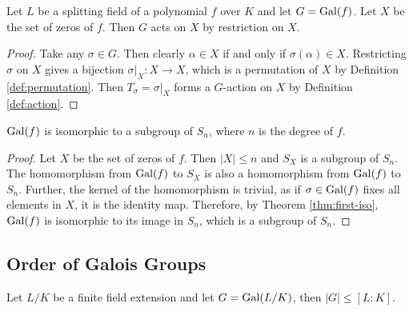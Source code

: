 \begin{theorem} \label{thm:galois-group-acts-on-zeros}
	Let $L$ be a splitting field of a polynomial $f$ over $K$ and let $G = \operatorname{Gal}(f)$. Let $X$ be the set of zeros of $f$. Then $G$ acts on $X$ by restriction on $X$. 
\end{theorem}

\begin{proof}
	Take any $\sigma \in G$. Then clearly $\alpha \in X$ if and only if $\sigma(\alpha) \in X$. Restricting $\sigma$ on $X$ gives a bijection $\sigma | _X : X \to X$, which is a permutation of $X$ by Definition \ref{def:permutation}. Then $T_\sigma  = \sigma | _X$ forms a $G$-action on $X$ by Definition \ref{def:action}.  
\end{proof}


\begin{corollary} \label{thm:galois-group-isomorphic-symmetric-subgroup}
	$\operatorname{Gal}(f)$ is isomorphic to a subgroup of $S_n$, where $n$ is the degree of $f$. 
\end{corollary}

\begin{proof}
	Let $X$ be the set of zeros of $f$. Then $|X| \le n$ and $S_X$ is a subgroup of $S_n$. The homomorphism from $\operatorname{Gal}(f)$ to $S_X$ is also a homomorphism from $\operatorname{Gal}(f)$ to $S_n$. Further, the kernel of the homomorphism is trivial, as if $\sigma \in \operatorname{Gal}(f)$ fixes all elements in $X$, it is the identity map. Therefore, by Theorem \ref{thm:first-iso}, $\operatorname{Gal}(f)$ is isomorphic to its image in $S_n$, which is a subgroup of $S_n$. 
\end{proof}






\subsection{Order of Galois Groups}



\begin{theorem} \label{thm:galois-group-order-upper-bound}
    Let $L/K$ be a finite field extension and let $G = \operatorname{Gal}(L/K)$, then $|G| \le [L:K]$. 
\end{theorem}


